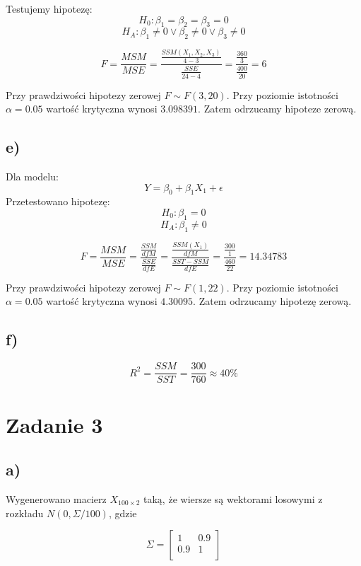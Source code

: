 \documentclass[9pt]{article}  %
\begin{document}
  
      Testujemy hipotezę:
  $$H_0: \beta_1 = \beta_2= \beta_3 = 0$$
  $$H_A: \beta_1 \ne 0 \vee \beta_2 \ne 0 \vee \beta_3 \ne 0 $$
  
  $$F = \frac{MSM}{MSE} = \frac{ \frac{SSM(X_1, X_2, X_3)}{4-3}  }{ \frac{SSE}{24-4} } = \frac{ \frac{ 360 }{3}  }{ \frac{400}{20} } = 6$$
  
  
      Przy prawdziwości hipotezy zerowej $F \sim F(3,20)$. Przy poziomie istotności $\alpha = 0.05$ wartość krytyczna wynosi $3.098391$. Zatem odrzucamy hipoteze zerową.
  
  \subsection{e)}
  
  Dla modelu:
  $$Y = \beta_0 + \beta_1 X_1 + \epsilon$$
  Przetestowano hipotezę:
  $$H_0: \beta_1 = 0$$
  $$H_A: \beta_1 \ne 0$$
  
    $$F = \frac{MSM}{MSE} = \frac{ \frac{SSM}{dfM}  }{ \frac{SSE}{dfE} } = 
    \frac{ \frac{SSM(X_1)}{dfM}  }{ \frac{SST-SSM}{dfE} } = \frac{ \frac{300}{1}  }{ \frac{460}{22} } = 14.34783$$
  
        Przy prawdziwości hipotezy zerowej $F \sim F(1,22)$. Przy poziomie istotności $\alpha = 0.05$ wartość krytyczna wynosi $4.30095$. Zatem odrzucamy hipotezę zerową.
  
  
  \subsection{f)}
  
  $$R^2 = \frac{SSM}{SST} = \frac{300}{760} \approx 40\% $$
  
\section{Zadanie 3}



  \subsection{a)}
  Wygenerowano macierz $X_{100\times 2}$ taką, że wiersze są wektorami losowymi z rozkładu $N(0,\Sigma /100)$, gdzie 
  
  \[
  \Sigma = 
  \begin{bmatrix}
    1       & 0.9 \\
    0.9      & 1 \\
  \end{bmatrix}
  \]
\end{document}
